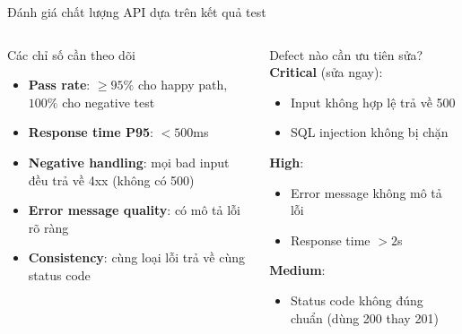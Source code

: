 \documentclass[aspectratio=169,10pt]{beamer}
\begin{document}
\begin{frame}{Đánh giá chất lượng API dựa trên kết quả test}
  \begin{columns}
    \begin{block}{Các chỉ số cần theo dõi}
      \begin{itemize}
        \item \textbf{Pass rate}: $\geq 95\%$ cho happy path, $100\%$ cho negative test
        \item \textbf{Response time P95}: $< 500$ms
        \item \textbf{Negative handling}: mọi bad input đều trả về 4xx (không có 500)
        \item \textbf{Error message quality}: có mô tả lỗi rõ ràng
        \item \textbf{Consistency}: cùng loại lỗi trả về cùng status code
      \end{itemize}
    \end{block}

    \begin{exampleblock}{Defect nào cần ưu tiên sửa?}
      \textbf{Critical} (sửa ngay):
      \begin{itemize}
        \item Input không hợp lệ trả về 500
        \item SQL injection không bị chặn
      \end{itemize}
      \textbf{High}:
      \begin{itemize}
        \item Error message không mô tả lỗi
        \item Response time $> 2$s
      \end{itemize}
      \textbf{Medium}:
      \begin{itemize}
        \item Status code không đúng chuẩn (dùng 200 thay 201)
      \end{itemize}
    \end{exampleblock}
  \end{columns}
\end{frame}
\end{document}
